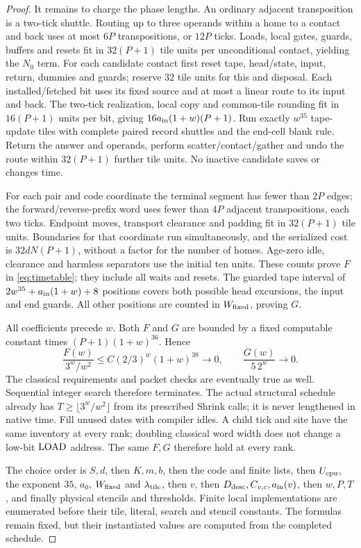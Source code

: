 \begin{proof}
It remains to charge the phase lengths. An ordinary adjacent transposition is a two-tick shuttle. Routing up to three operands within a home to a contact and back uses at most $6P$ transpositions, or $12P$ ticks. Loads, local gates, guards, buffers and resets fit in $32(P+1)$ tile units per unconditional contact, yielding the $N_0$ term. For each candidate contact first reset tape, head/state, input, return, dummies and guards; reserve $32$ tile units for this and disposal. Each installed/fetched bit uses its fixed source and at most a linear route to its input and back. The two-tick realization, local copy and common-tile rounding fit in $16(P+1)$ units per bit, giving $16a_{\rm in}(1+w)(P+1)$. Run exactly $w^{35}$ tape-update tiles with complete paired record shuttles and the end-cell blank rule. Return the answer and operands, perform scatter/contact/gather and undo the route within $32(P+1)$ further tile units. No inactive candidate saves or changes time.

For each pair and code coordinate the terminal segment has fewer than $2P$ edges; the forward/reverse-prefix word uses fewer than $4P$ adjacent transpositions, each two ticks. Endpoint moves, transport clearance and padding fit in $32(P+1)$ tile units. Boundaries for that coordinate run simultaneously, and the serialized cost is $32dN(P+1)$, without a factor for the number of homes. Age-zero idle, clearance and harmless separators use the initial ten units. These counts prove $F$ in \eqref{eq:timetable}; they include all waits and resets. The guarded tape interval of $2w^{35}+a_{\rm in}(1+w)+8$ positions covers both possible head excursions, the input and end guards. All other positions are counted in $W_{\rm fixed}$, proving $G$.

All coefficients precede $w$. Both $F$ and $G$ are bounded by a fixed computable constant times $(P+1)(1+w)^{36}$. Hence
\[
 \frac{F(w)}{3^w/w^2}\le C(2/3)^w(1+w)^{38}\longrightarrow0,
 \qquad \frac{G(w)}{5\,2^w}\longrightarrow0.
\]
The classical requirements and packet checks are eventually true as well. Sequential integer search therefore terminates. The actual structural schedule already has $T\ge\lfloor3^w/w^2\rfloor$ from its prescribed Shrink calls; it is never lengthened in native time. Fill unused dates with compiler idles. A child tick and site have the same inventory at every rank; doubling classical word width does not change a low-bit $\operatorname{LOAD}$ address. The same $F,G$ therefore hold at every rank.

The choice order is $S,d$, then $K,m,b$, then the code and finite lists, then $U_{\rm cpu}$, the exponent $35$, $a_0$, $W_{\rm fixed}$ and $\lambda_{\rm tile}$, then $v$, then $D_{\rm desc},C_{v,c},a_{\rm in}(v)$, then $w,P,T$, and finally physical stencils and thresholds. Finite local implementations are enumerated before their tile, literal, search and stencil constants. The formulas remain fixed, but their instantiated values are computed from the completed schedule.
\end{proof}

